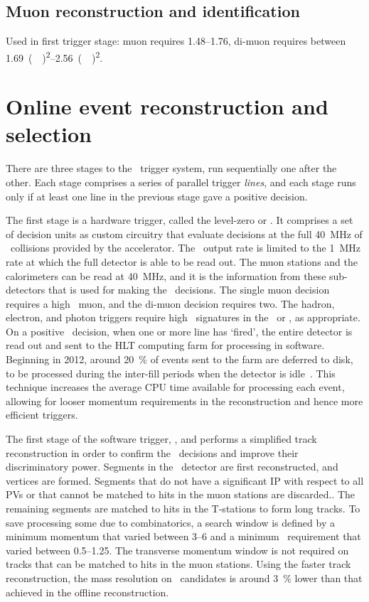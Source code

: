 \subsection{Muon reconstruction and identification}

Used in first trigger stage: muon requires \SIrange{1.48}{1.76}{\GeVc}, di-muon 
requires between \SIrange{1.69}{2.56}{(\GeVc)\squared}.

\section{Online event reconstruction and selection}
\label{chap:intro:lhcb:trigger}

There are three stages to the \lhcb\ trigger system, run sequentially one after 
the other.
Each stage comprises a series of parallel trigger \emph{lines}, and each stage 
runs only if at least one line in the previous stage gave a positive decision.

The first stage is a hardware trigger, called the level-zero or \lzero.
It comprises a set of decision units as custom circuitry that evaluate 
decisions at the full \SI{40}{\mega\hertz} of \pp\ collisions provided by the 
accelerator.
The \lzero\ output rate is limited to the \SI{1}{\mega\hertz} rate at which the 
full detector is able to be read out.
The muon stations and the calorimeters can be read at \SI{40}{\mega\hertz}, and 
it is the information from these sub-detectors that is used for making the 
\lzero\ decisions.
The single muon decision requires a high \pT\ muon, and the di-muon decision 
requires two.
The hadron, electron, and photon triggers require high \ET\ signatures in the 
\hcal\ or \ecal, as appropriate.
On a positive \lzero\ decision, when one or more line has `fired', the entire 
detector is read out and sent to the \ac{HLT} computing farm for processing in 
software.
Beginning in 2012, around \SI{20}{\percent} of events sent to the farm are 
deferred to disk, to be processed during the inter-fill periods when the 
detector is idle~\cite{1742-6596-513-1-012006}.
This technique increases the average CPU time available for processing each 
event, allowing for looser momentum requirements in the reconstruction and 
hence more efficient triggers.

The first stage of the software trigger, \hltone, and performs a simplified 
track reconstruction in order to confirm the \lzero\ decisions and improve 
their discriminatory power.
Segments in the \velo\ detector are first reconstructed, and \pp vertices are 
formed.
Segments that do not have a significant \ac{IP} with respect to all \acp{PV} or 
that cannot be matched to hits in the muon stations are discarded..
The remaining segments are matched to hits in the T-stations to form long 
tracks.
To save processing some due to combinatorics, a search window is defined by a 
minimum momentum that varied between \SIrange{3}{6}{\GeVc} and a minimum \pT\ 
requirement that varied between \SIrange{0.5}{1.25}{\GeVc}.
The transverse momentum window is not required on tracks that can be matched to 
hits in the muon stations.
Using the faster track reconstruction, the mass resolution on \JpsiTomumu\ 
candidates is around \SI{3}{\percent} lower than that achieved in the offline 
reconstruction.

